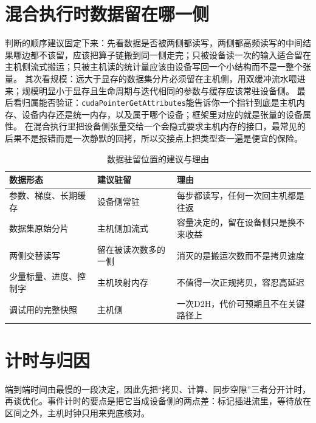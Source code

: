 \documentclass[12pt,a4paper,fontset=fandol]{ctexbook}
\newcommand{\Tp}[1]{\texttt{#1}}
\begin{document}
\section{混合执行时数据留在哪一侧}

判断的顺序建议固定下来：先看数据是否被两侧都读写，两侧都高频读写的中间结果哪边都不该留，应该把算子链搬到同一侧走完；只被设备读一次的输入适合留在主机侧流式搬运；只被主机读的统计量应该由设备写回一个小结构而不是一整个张量。
其次看规模：远大于显存的数据集分片必须留在主机侧，用双缓冲流水喂进来；规模明显小于显存且生命周期与迭代相同的参数与缓存应该常驻设备侧。
最后看归属能否验证：\Tp{cudaPointerGetAttributes}能告诉你一个指针到底是主机内存、设备内存还是统一内存，以及属于哪个设备；框架里对应的就是张量的设备属性。
在混合执行里把设备侧张量交给一个会隐式要求主机内存的接口，最常见的后果不是报错而是一次静默的回拷，所以交接点上把类型查一遍是便宜的保险。

\begin{table}[H]
\centering
\caption{数据驻留位置的建议与理由}
\begin{tabular}{@{}>{\raggedright\arraybackslash}p{}
  >{\raggedright\arraybackslash}p{}
  >{\raggedright\arraybackslash}p{}@{}}
\toprule
数据形态 & 建议驻留 & 理由 \\
\midrule
参数、梯度、长期缓存 & 设备侧常驻 & 每步都读写，任何一次回主机都是往返 \\
数据集原始分片 & 主机侧加流式 & 容量决定的，留在设备侧只是换不来收益 \\
两侧交替读写 & 留在被读次数多的一侧 & 消灭的是搬运次数而不是拷贝速度 \\
少量标量、进度、控制字 & 主机映射内存 & 不值得一次正规拷贝，容忍高延迟 \\
调试用的完整快照 & 主机侧 & 一次D2H，代价可预期且不在关键路径上 \\
\bottomrule
\end{tabular}
\end{table}

\section{计时与归因}

端到端时间由最慢的一段决定，因此先把``拷贝、计算、同步空隙''三者分开计时，再谈优化。事件计时的要点是把它当成设备侧的两点差：标记插进流里，等待放在区间之外，主机时钟只用来兜底核对。
\end{document}
